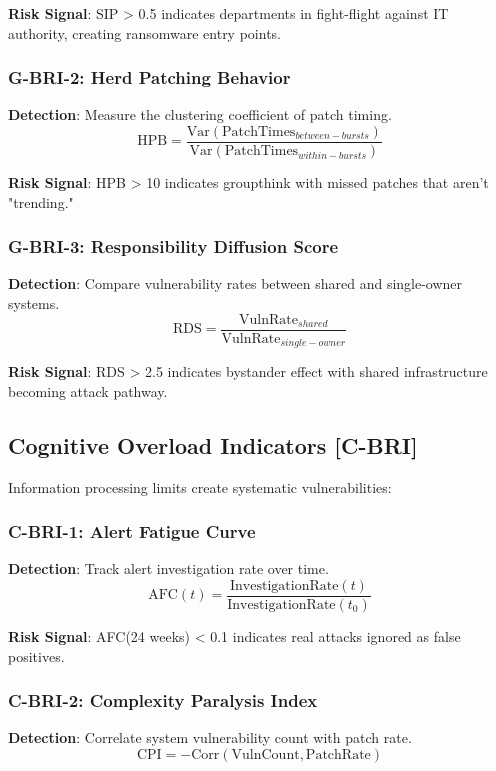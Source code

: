 \documentclass[11pt,a4paper]{article}
\begin{document}
\textbf{Risk Signal}: SIP > 0.5 indicates departments in fight-flight against IT authority, creating ransomware entry points.

\subsubsection{G-BRI-2: Herd Patching Behavior}
\textbf{Detection}: Measure the clustering coefficient of patch timing.
\begin{equation}
\text{HPB} = \frac{\text{Var}(\text{PatchTimes}_{between-bursts})}{\text{Var}(\text{PatchTimes}_{within-bursts})}
\end{equation}

\textbf{Risk Signal}: HPB > 10 indicates groupthink with missed patches that aren't "trending."

\subsubsection{G-BRI-3: Responsibility Diffusion Score}
\textbf{Detection}: Compare vulnerability rates between shared and single-owner systems.
\begin{equation}
\text{RDS} = \frac{\text{VulnRate}_{shared}}{\text{VulnRate}_{single-owner}}
\end{equation}

\textbf{Risk Signal}: RDS > 2.5 indicates bystander effect with shared infrastructure becoming attack pathway.

\subsection{Cognitive Overload Indicators [C-BRI]}

Information processing limits create systematic vulnerabilities:

\subsubsection{C-BRI-1: Alert Fatigue Curve}
\textbf{Detection}: Track alert investigation rate over time.
\begin{equation}
\text{AFC}(t) = \frac{\text{InvestigationRate}(t)}{\text{InvestigationRate}(t_0)}
\end{equation}

\textbf{Risk Signal}: AFC(24 weeks) < 0.1 indicates real attacks ignored as false positives.

\subsubsection{C-BRI-2: Complexity Paralysis Index}
\textbf{Detection}: Correlate system vulnerability count with patch rate.
\begin{equation}
\text{CPI} = -\text{Corr}(\text{VulnCount}, \text{PatchRate})
\end{equation}
\end{document}
